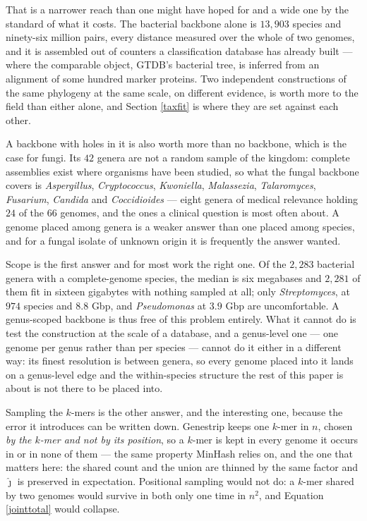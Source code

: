 \documentclass[pdflatex,sn-vancouver-num]{sn-jnl}
\begin{document}
That is a narrower reach than one might have hoped for and a wide one by the standard of what it
costs. The bacterial backbone alone is $13{,}903$ species and ninety-six million pairs, every distance
measured over the whole of two genomes, and it is assembled out of counters a classification database
has already built --- where the comparable object, GTDB's bacterial tree, is inferred from an
alignment of some hundred marker proteins. Two independent constructions of the same phylogeny at the
same scale, on different evidence, is worth more to the field than either alone, and
Section \ref{taxfit} is where they are set against each other.

A backbone with holes in it is also worth more than no backbone, which is the case for fungi. Its
$42$ genera are not a random sample of the kingdom: complete assemblies exist where organisms have
been studied, so what the fungal backbone covers is \emph{Aspergillus}, \emph{Cryptococcus},
\emph{Kwoniella}, \emph{Malassezia}, \emph{Talaromyces}, \emph{Fusarium}, \emph{Candida} and
\emph{Coccidioides} --- eight genera of medical relevance holding $24$ of the $66$ genomes, and the
ones a clinical question is most often about. A genome placed among genera is a weaker answer than one
placed among species, and for a fungal isolate of unknown origin it is frequently the answer wanted.

Scope is the first answer and for most work the right one. Of the $2{,}283$ bacterial genera with a
complete-genome species, the median is six megabases and $2{,}281$ of them fit in sixteen gigabytes
with nothing sampled at all; only \emph{Streptomyces}, at $974$ species and $8.8$ Gbp, and
\emph{Pseudomonas} at $3.9$ Gbp are uncomfortable. A genus-scoped backbone is thus free of this
problem entirely. What it cannot do is test the construction at the scale of a database, and a
genus-level one --- one genome per genus rather than per species --- cannot do it either in a
different way: its finest resolution is between genera, so every genome placed into it lands on a
genus-level edge and the within-species structure the rest of this paper is about is not there to be
placed into.

Sampling the $k$-mers is the other answer, and the interesting one, because the error it introduces
can be written down. Genestrip keeps one $k$-mer in $n$, chosen \emph{by the $k$-mer and not by its
position}, so a $k$-mer is kept in every genome it occurs in or in none of them --- the same property
MinHash relies on, and the one that matters here: the shared count and the union are thinned by the
same factor and $\widehat{\jmath}$ is preserved in expectation. Positional sampling would not do:
a $k$-mer shared by two genomes would survive in both only one time in $n^2$, and
Equation \eqref{jointtotal} would collapse.
\end{document}
